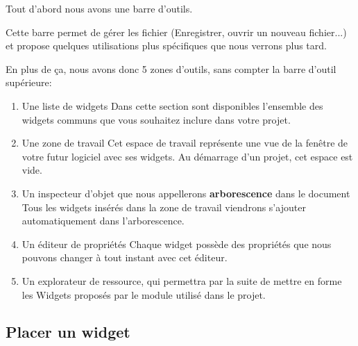 \documentclass[12pt]{report}    %
\begin{document}
Tout d'abord nous avons une barre d'outils. \newline



Cette barre permet de gérer les fichier (Enregistrer, ouvrir un nouveau fichier...) et propose quelques utilisations plus spécifiques que nous verrons plus tard. \newline

En plus de ça, nous avons donc 5 zones d'outils, sans compter la barre d'outil supérieure: 

\begin{enumerate}

    \item {\color{green}Une liste de widgets}
    Dans cette section sont disponibles l'ensemble des widgets communs que vous souhaitez inclure dans votre projet.

    \item {\color{blue}Une zone de travail}
    Cet espace de travail représente une vue de la fenêtre de votre futur logiciel avec ses widgets. \newline
    Au démarrage d'un projet, cet espace est vide.


    \item {\color{red}Un inspecteur d'objet que nous appellerons \textbf{arborescence} dans le document}
    Tous les widgets insérés dans la zone de travail viendrons s'ajouter automatiquement dans l'arborescence.

    
    \item {\color{magenta}Un éditeur de propriétés}
    Chaque widget possède des propriétés que nous pouvons changer à tout instant avec cet éditeur.

    \item {\color{gray}Un explorateur de ressource}, qui permettra par la suite de mettre en forme les Widgets proposés par le module  utilisé dans le projet.
    
\end{enumerate}


\subsection{Placer un widget}
\end{document}
